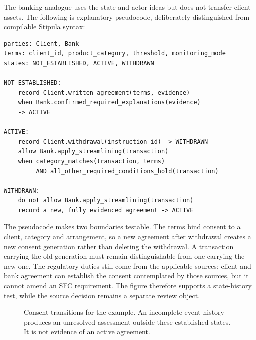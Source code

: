 \documentclass[12pt,a4paper,oneside,openany]{book}
\begin{document}
The banking analogue uses the state and actor ideas but does not transfer client
assets. The following is explanatory pseudocode, deliberately distinguished
from compilable Stipula syntax:
\begin{lstlisting}[caption={A consent model inspired by Stipula. ``Record'' observes an event; ``allow'' describes the control's decision.}]
parties: Client, Bank
terms: client_id, product_category, threshold, monitoring_mode
states: NOT_ESTABLISHED, ACTIVE, WITHDRAWN

NOT_ESTABLISHED:
    record Client.written_agreement(terms, evidence)
    when Bank.confirmed_required_explanations(evidence)
    -> ACTIVE

ACTIVE:
    record Client.withdrawal(instruction_id) -> WITHDRAWN
    allow Bank.apply_streamlining(transaction)
    when category_matches(transaction, terms)
         AND all_other_required_conditions_hold(transaction)

WITHDRAWN:
    do not allow Bank.apply_streamlining(transaction)
    record a new, fully evidenced agreement -> ACTIVE
\end{lstlisting}
The pseudocode makes two boundaries testable. The terms bind consent to a
client, category and arrangement, so a new agreement after withdrawal creates a
new consent generation rather than deleting the withdrawal. A transaction
carrying the old generation must remain distinguishable from one carrying the
new one. The regulatory duties still come from the applicable sources: client
and bank agreement can establish the consent contemplated by those sources, but
it cannot amend an SFC requirement. The figure therefore supports a state-history
test, while the source decision remains a separate review object.

\begin{figure}[htbp]
\centering
{}
\caption{Consent transitions for the example. An incomplete event history produces
an unresolved assessment outside these established states. It is not evidence
of an active agreement.}
\label{fig:consent-tutorial}
\end{figure}
\end{document}
